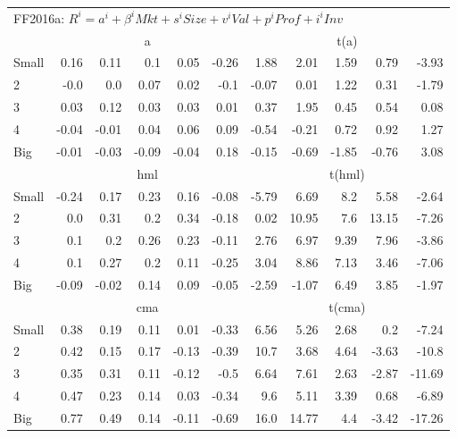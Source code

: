 \begin{table}[!ht]
\begin{tabular}{lrrrrrrrrrr}
  \midrule
  \multicolumn{9}{l}{FF2016a: $R^i=a^i+\beta^iMkt+s^iSize+v^iVal+p^iProf+i^iInv$} \\

      & \multicolumn{5}{c}{a} & \multicolumn{5}{c}{t(a)} \\
    \cmidrule(r){2-6} \cmidrule(r){7-11}
      Small  & 0.16  & 0.11  & 0.1  & 0.05  & -0.26   & 1.88  & 2.01  & 1.59  & 0.79  & -3.93  \\
          2  & -0.0  & 0.0  & 0.07  & 0.02  & -0.1   & -0.07  & 0.01  & 1.22  & 0.31  & -1.79  \\
          3  & 0.03  & 0.12  & 0.03  & 0.03  & 0.01   & 0.37  & 1.95  & 0.45  & 0.54  & 0.08  \\
          4  & -0.04  & -0.01  & 0.04  & 0.06  & 0.09   & -0.54  & -0.21  & 0.72  & 0.92  & 1.27  \\
      Big    & -0.01  & -0.03  & -0.09  & -0.04  & 0.18   & -0.15  & -0.69  & -1.85  & -0.76  & 3.08  \\

      & \multicolumn{5}{c}{hml} & \multicolumn{5}{c}{t(hml)} \\
    \cmidrule(r){2-6} \cmidrule(r){7-11}
      Small  & -0.24  & 0.17  & 0.23  & 0.16  & -0.08   & -5.79  & 6.69  & 8.2  & 5.58  & -2.64  \\
          2  & 0.0  & 0.31  & 0.2  & 0.34  & -0.18   & 0.02  & 10.95  & 7.6  & 13.15  & -7.26  \\
          3  & 0.1  & 0.2  & 0.26  & 0.23  & -0.11   & 2.76  & 6.97  & 9.39  & 7.96  & -3.86  \\
          4  & 0.1  & 0.27  & 0.2  & 0.11  & -0.25   & 3.04  & 8.86  & 7.13  & 3.46  & -7.06  \\
      Big    & -0.09  & -0.02  & 0.14  & 0.09  & -0.05   & -2.59  & -1.07  & 6.49  & 3.85  & -1.97  \\

      & \multicolumn{5}{c}{cma} & \multicolumn{5}{c}{t(cma)} \\
    \cmidrule(r){2-6} \cmidrule(r){7-11}
      Small  & 0.38  & 0.19  & 0.11  & 0.01  & -0.33   & 6.56  & 5.26  & 2.68  & 0.2  & -7.24  \\
          2  & 0.42  & 0.15  & 0.17  & -0.13  & -0.39   & 10.7  & 3.68  & 4.64  & -3.63  & -10.8  \\
          3  & 0.35  & 0.31  & 0.11  & -0.12  & -0.5   & 6.64  & 7.61  & 2.63  & -2.87  & -11.69  \\
          4  & 0.47  & 0.23  & 0.14  & 0.03  & -0.34   & 9.6  & 5.11  & 3.39  & 0.68  & -6.89  \\
      Big    & 0.77  & 0.49  & 0.14  & -0.11  & -0.69   & 16.0  & 14.77  & 4.4  & -3.42  & -17.26  \\
  

  \bottomrule
\end{tabular}
\end{table}